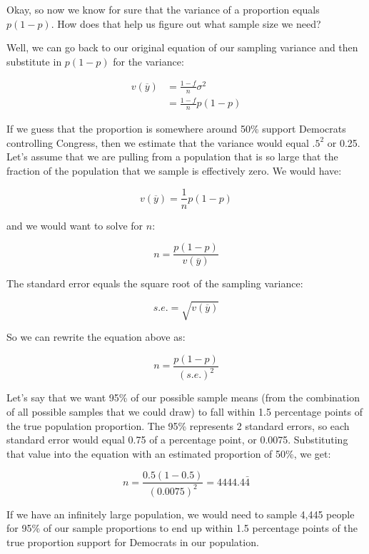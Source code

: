 \documentclass[11pt]{lecturenotes}
\begin{document}
Okay, so now we know for sure that the variance of a proportion equals $p(1-p)$. How does that help us figure out what sample size we need? 

Well, we can go back to our original equation of our sampling variance and then substitute in $p(1-p)$ for the variance:

\begin{align*}
v(\overline{y})& =\frac{1-f}{n}\sigma^2 \\
& = \frac{1-f}{n}p(1-p)
\end{align*}

If we guess that the proportion is somewhere around 50\% support Democrats controlling Congress, then we estimate that the variance would equal $.5^2$ or 0.25. Let's assume that we are pulling from a population that is so large that the fraction of the population that we sample is effectively zero. We would have: 

\[ v(\overline{y}) = \frac{1}{n}p(1-p) \]

and we would want to solve for $n$: 

\[ n = \frac{p(1-p)}{v(\overline{y})} \]

The standard error equals the square root of the sampling variance: 

\[ s.e. = \sqrt{v(\overline{y})} \]

So we can rewrite the equation above as:

\[ n = \frac{p(1-p)}{(s.e.)^2} \]

Let's say that we want 95\% of our possible sample means (from the combination of all possible samples that we could draw) to fall within 1.5 percentage points of the true population proportion. The 95\% represents 2 standard errors, so each standard error would equal 0.75 of a percentage point, or 0.0075. Substituting that value into the equation with an estimated proportion of 50\%, we get: 

\[ n = \frac{0.5(1-0.5)}{(0.0075)^2} = 4444.4\bar{4} \]

If we have an infinitely large population, we would need to sample 4,445 people for 95\% of our sample proportions to end up within 1.5 percentage points of the true proportion support for Democrats in our population. 
\end{document}
